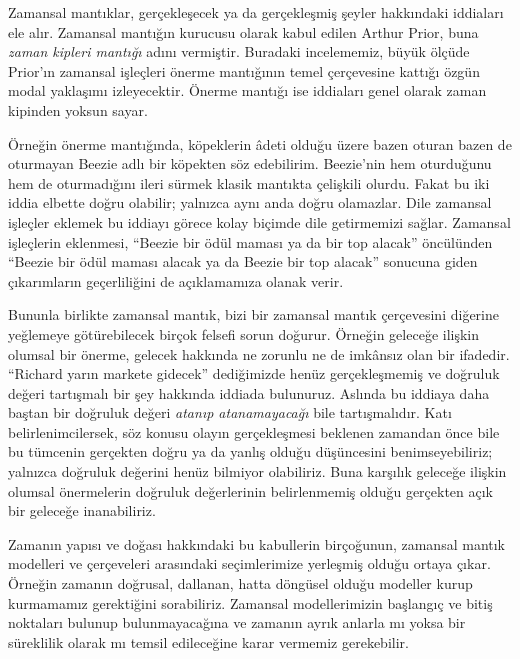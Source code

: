 



Zamansal mantıklar, gerçekleşecek ya da gerçekleşmiş şeyler hakkındaki
iddiaları ele alır. Zamansal mantığın kurucusu olarak kabul edilen Arthur
Prior, buna \emph{zaman kipleri mantığı} adını vermiştir. Buradaki
incelememiz, büyük ölçüde Prior'ın zamansal işleçleri önerme mantığının temel
çerçevesine kattığı özgün modal yaklaşımı izleyecektir. Önerme mantığı ise
iddiaları genel olarak zaman kipinden yoksun sayar.

Örneğin önerme mantığında, köpeklerin âdeti olduğu üzere bazen oturan bazen
de oturmayan Beezie adlı bir köpekten söz edebilirim. Beezie'nin hem
oturduğunu hem de oturmadığını ileri sürmek klasik mantıkta çelişkili olurdu.
Fakat bu iki iddia elbette doğru olabilir; yalnızca aynı anda doğru olamazlar.
Dile zamansal işleçler eklemek bu iddiayı görece kolay biçimde dile
getirmemizi sağlar. Zamansal işleçlerin eklenmesi, ``Beezie bir ödül maması
ya da bir top alacak'' öncülünden ``Beezie bir ödül maması alacak ya da
Beezie bir top alacak'' sonucuna giden çıkarımların geçerliliğini de
açıklamamıza olanak verir.

Bununla birlikte zamansal mantık, bizi bir zamansal mantık çerçevesini
diğerine yeğlemeye götürebilecek birçok felsefi sorun doğurur. Örneğin
geleceğe ilişkin olumsal bir önerme, gelecek hakkında ne zorunlu ne de
imkânsız olan bir ifadedir. ``Richard yarın markete gidecek'' dediğimizde
henüz gerçekleşmemiş ve doğruluk değeri tartışmalı bir şey hakkında iddiada
bulunuruz. Aslında bu iddiaya daha baştan bir doğruluk değeri
\emph{atanıp atanamayacağı} bile tartışmalıdır. Katı belirlenimcilersek, söz
konusu olayın gerçekleşmesi beklenen zamandan önce bile bu tümcenin gerçekten
doğru ya da yanlış olduğu düşüncesini benimseyebiliriz; yalnızca doğruluk
değerini henüz bilmiyor olabiliriz. Buna karşılık geleceğe ilişkin olumsal
önermelerin doğruluk değerlerinin belirlenmemiş olduğu gerçekten açık bir
geleceğe inanabiliriz.

Zamanın yapısı ve doğası hakkındaki bu kabullerin birçoğunun, zamansal mantık
modelleri ve çerçeveleri arasındaki seçimlerimize yerleşmiş olduğu ortaya
çıkar. Örneğin zamanın doğrusal, dallanan, hatta döngüsel olduğu modeller
kurup kurmamamız gerektiğini sorabiliriz. Zamansal modellerimizin başlangıç
ve bitiş noktaları bulunup bulunmayacağına ve zamanın ayrık anlarla mı yoksa
bir süreklilik olarak mı temsil edileceğine karar vermemiz gerekebilir.

